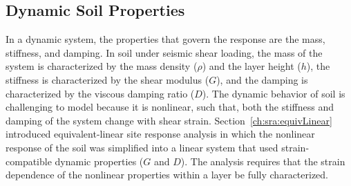 \documentclass[12pt,oneside]{book}
\begin{document}
%

\subsection{Dynamic Soil Properties}\label{ch:sra:dynprops}
In a dynamic system,  the properties that govern the response are the mass, stiffness, and damping.
In soil under seismic shear loading, the mass of the system is characterized by the mass density
($\rho$) and the layer height ($h$), the stiffness is characterized by the shear modulus ($G$), and
the damping is characterized by the viscous damping ratio ($D$).  The dynamic behavior of soil is
challenging to model because it is nonlinear, such that, both the stiffness and damping of the
system change with shear strain.  Section~\ref{ch:sra:equivLinear} introduced
equivalent-linear site response analysis in which the nonlinear response of the soil was simplified
into a linear system that used strain-compatible dynamic properties ($G$ and $D$).  The analysis
requires that the strain dependence of the nonlinear properties within a layer be fully
characterized.
\end{document}
